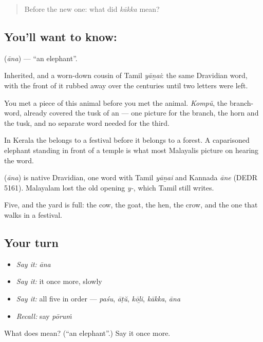 \begin{quote}
Before the new one: what did \emph{kākka} mean?
\end{quote}

\subsection*{You'll want to know: }
\textbf{} (\emph{āna}) — \textquotedblleft{}an elephant\textquotedblright{}.

Inherited, and a worn-down cousin of Tamil \emph{yāṉai}: the same Dravidian word, with the front of it rubbed away over the centuries until two letters were left.

You met a piece of this animal before you met the animal. \emph{Kompŭ}, the branch-word, already covered the tusk of an  — one picture for the branch, the horn and the tusk, and no separate word needed for the third.

In Kerala the  belongs to a festival before it belongs to a forest. A caparisoned elephant standing in front of a temple is what most Malayalis picture on hearing the word.

\begin{cousinweb}
\textbf{} (\emph{āna}) is native Dravidian, one word with Tamil \emph{yāṉai} and Kannada \emph{āne} (DEDR 5161). Malayalam lost the old opening \emph{y-}, which Tamil still writes.
\end{cousinweb}

\begin{grammarlens}[title={What you've built}]
Five, and the yard is full: the cow, the goat, the hen, the crow, and the one that walks in a festival.
\end{grammarlens}

\subsection*{Your turn}
\begin{itemize}
\raggedright
  \item \emph{Say it:} \emph{āna}
  \item \emph{Say it:} it once more, slowly
  \item \emph{Say it:} all five in order — \emph{paśu}, \emph{āṭŭ}, \emph{kōḻi}, \emph{kākka}, \emph{āna}
  \item \emph{Recall:} say \emph{pōruṁ}
\end{itemize}

\begin{tcolorbox}[breakable,colback=teal!4,colframe=teal!35!black,title={Before you move on}]
What does  mean? (\textquotedblleft{}an elephant\textquotedblright{}.) Say it once more.
\end{tcolorbox}
